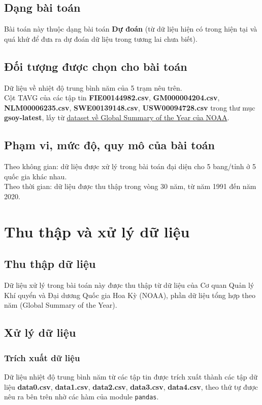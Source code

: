 \documentclass[a4paper]{article}
\begin{document}
\subsection{Dạng bài toán}
Bài toán này thuộc dạng bài toán \textbf{Dự đoán} (từ dữ liệu hiện có trong hiện tại và quá khứ để đưa ra dự đoán dữ liệu trong tương lai chưa biết).

\subsection{Đối tượng được chọn cho bài toán}
Dữ liệu về nhiệt độ trung bình năm của 5 trạm nêu trên.\\
Cột TAVG của các  tập tin \textbf{FIE00144982.csv}, \textbf{GM000004204.csv}, \textbf{NLM00006235.csv}, \textbf{SWE00139148.csv}, \textbf{USW00094728.csv}  trong thư mục \textbf{gsoy-latest}, lấy từ \href{https://www.ncei.noaa.gov/data/gsoy/archive/}{dataset về Global Summary of the Year của NOAA}.

\subsection{Phạm vi, mức độ, quy mô của bài toán}
Theo không gian: dữ liệu được xử lý trong bài toán đại diện cho 5 bang/tỉnh ở 5 quốc gia khác nhau.\\
Theo thời gian: dữ liệu được thu thập trong vòng 30 năm, từ năm 1991 đến năm 2020.

\section{Thu thập và xử lý dữ liệu}
\subsection{Thu thập dữ liệu}
Dữ liệu xử lý trong bài toán này được thu thập từ dữ liệu của Cơ quan Quản lý Khí quyển và Đại dương Quốc gia Hoa Kỳ (NOAA), phần dữ liệu tổng hợp theo năm (Global Summary of the Year).

\subsection{Xử lý dữ liệu}
\subsubsection{Trích xuất dữ liệu}
Dữ liệu nhiệt độ trung bình năm từ các tập tin được trích xuất thành các tập dữ liệu \textbf{data0.csv}, \textbf{data1.csv}, \textbf{data2.csv}, \textbf{data3.csv}, \textbf{data4.csv}, theo thứ tự được nêu ra bên trên nhờ các hàm của module \lstinline{pandas}.
\end{document}
